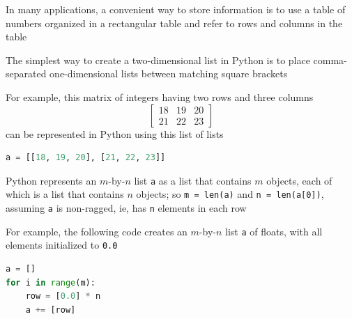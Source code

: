 \documentclass[8pt,a4paper,compress]{beamer}
\begin{document}
\begin{frame}[fragile]
\pause

In many applications, a convenient way to store information is to use a table of numbers organized in a rectangular table and refer to rows and columns in the table

\pause
\bigskip

The simplest way to create a two-dimensional list in Python is to place comma-separated one-dimensional lists between matching square brackets 

\pause
\bigskip

For example, this matrix of integers having two rows and three columns 
\[
\begin{bmatrix}
18 & 19 & 20 \\ 
21 & 22 & 23
\end{bmatrix}
\]
can be represented in Python using this list of lists
\begin{lstlisting}[language=Python]
a = [[18, 19, 20], [21, 22, 23]]
\end{lstlisting}

\pause
\bigskip

Python represents an $m$-by-$n$ list \lstinline{a} as a list that contains $m$ objects, each of which is a list that contains $n$ objects; so \lstinline{m = len(a)} and \lstinline{n = len(a[0])}, assuming \lstinline{a} is non-ragged, ie, has \lstinline{n} elements in each row

\pause
\bigskip

For example, the following code creates an $m$-by-$n$ list \lstinline{a} of floats, with all elements initialized to \lstinline{0.0}
\begin{lstlisting}[language=Python]
a = []
for i in range(m):
    row = [0.0] * n
    a += [row]
\end{lstlisting}
\end{frame}
\end{document}
